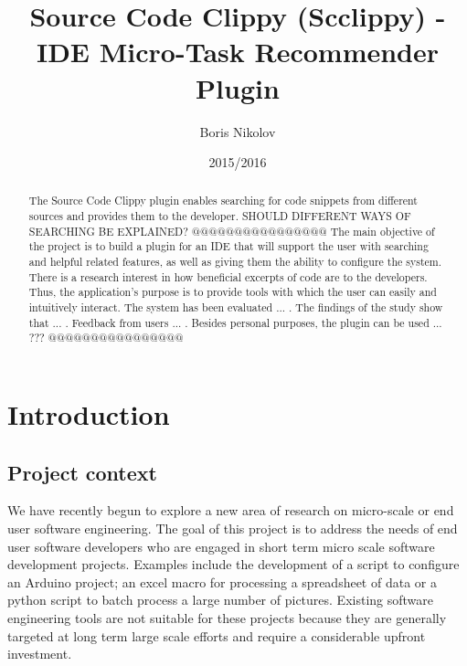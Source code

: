 \documentclass{l4proj}
\begin{document}
\title{Source Code Clippy (Scclippy) - IDE Micro-Task Recommender Plugin}
\author{Boris Nikolov}
\date{2015/2016}
\maketitle

\begin{abstract}
The Source Code Clippy plugin enables searching for code snippets from different sources and provides them to the developer. 
SHOULD DIFFERENT WAYS OF SEARCHING BE EXPLAINED? @@@@@@@@@@@@@@@@
The main objective of the project is to build a plugin for an IDE that will support the user with searching and helpful related features, as well as giving them the ability to configure the system. There is a research interest in how beneficial excerpts of code are to the developers. Thus, the application's purpose is to provide tools with which the user can easily and intuitively interact. 
The system has been evaluated ... . The findings of the study show that ... . Feedback from users ... . Besides personal purposes, the plugin can be used ... ??? @@@@@@@@@@@@@@@@
\end{abstract}

\educationalconsent
%
%
\tableofcontents

\chapter{Introduction}

\section{Project context}

We have recently begun to explore a new area of research on micro-scale or end user software engineering. The goal of this project is to address the needs of end user software developers who are engaged in short term micro scale software development projects. Examples include the development of a script to configure an Arduino project; an excel macro for processing a spreadsheet of data or a python script to batch process a large number of pictures. Existing software engineering tools are not suitable for these projects because they are generally targeted at long term large scale efforts and require a considerable upfront investment. 
\end{document}
